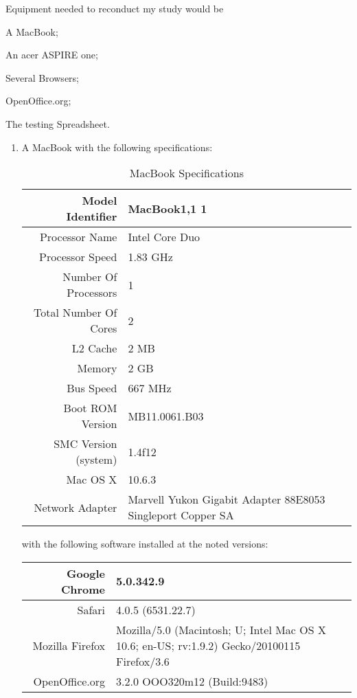 \documentclass[12pt,oneside,letterpaper,titlepage]{article}
\begin{document}
Equipment needed to reconduct my study would be
\begin{inparaenum}[(1)]
\item A MacBook;
\item An acer ASPIRE one;
\item Several Browsers;
\item OpenOffice.org;
\item The testing Spreadsheet.
\end{inparaenum}

\begin{enumerate}

\item A MacBook with the following specifications:

  \begin{table}[htbp]
    \caption{MacBook Specifications}
    \begin{tabular}{| r | p{5cm} |}
      \hline
      Model Identifier      & MacBook1,1 1 \\ \hline
      Processor Name        & Intel Core Duo \\ \hline
      Processor Speed       & 1.83 GHz \\ \hline
      Number Of Processors  & 1 \\ \hline
      Total Number Of Cores & 2 \\ \hline
      L2 Cache              & 2 MB \\ \hline
      Memory                & 2 GB \\ \hline
      Bus Speed             & 667 MHz \\ \hline
      Boot ROM Version      & MB11.0061.B03 \\ \hline
      SMC Version (system)  & 1.4f12 \\ \hline
      Mac OS X              & 10.6.3 \\ \hline
      Network  Adapter      & Marvell Yukon Gigabit Adapter 88E8053 Singleport
      Copper SA \\
      \hline
    \end{tabular}
  \end{table}

  with the following software installed at the noted versions:

  \begin{table}[htbp]
    \begin{tabular}{| r | p{5cm} |}
      \hline
      Google Chrome       & 5.0.342.9 \\ \hline
      Safari              & 4.0.5 (6531.22.7) \\ \hline
      Mozilla Firefox     & Mozilla/5.0 (Macintosh; U; Intel Mac OS X 10.6; en-US;
                            rv:1.9.2) Gecko/20100115 Firefox/3.6 \\ \hline
      OpenOffice.org      & 3.2.0 OOO320m12 (Build:9483) \\
      \hline
    \end{tabular}
  \end{table}


\end{enumerate}
\end{document}
